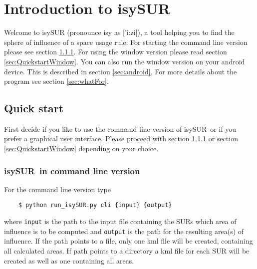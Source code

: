 \documentclass[11pt,fleqn]{book} %
\newcommand{\ProjectTitle}{isySUR}
\newcommand{\pt}{\ProjectTitle}
\begin{document}

\pagestyle{empty} %

\setcounter{tocdepth}{3}
\tableofcontents %

\cleardoublepage %

\pagestyle{fancy} %


\chapter{Introduction to \ProjectTitle}
Welcome to isySUR (pronounce isy as ['i:zi]), a tool helping you to find the sphere of influence of a space usage rule. For starting the command line version please see section \ref{sec:QuickstartTerminal}. For using the window version please read section \ref{sec:QuickstartWindow}. You can also run the window version on your android device. This is described in section \ref{sec:android}. For more details about the program see section \ref{sec:whatFor}.

\section{Quick start}
First decide if you like to use the command line version of \pt\ or if you prefer a graphical user interface. Please proceed with section \ref{sec:QuickstartTerminal} or section \ref{sec:QuickstartWindow} depending on your choice.

\subsection{\ProjectTitle\ in command line version}\label{sec:QuickstartTerminal}
For the command line version type
\begin{verbatim}
	$ python run_isySUR.py cli {input} {output}
\end{verbatim}
where \texttt{input} is the path to the input file containing the SURs which area of influence is to be computed and \texttt{output} is the path for the resulting area(s) of influence. If the path points to a file, only one kml file will be created, containing all calculated areas. If path points to a directory a kml file for each SUR will be created as well as one containing all areas.
\end{document}
